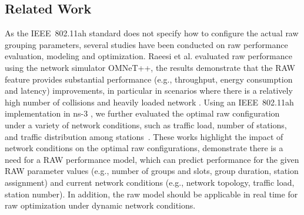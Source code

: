  
\subsection{Related Work \label{subsec:related_work}}


As the IEEE~802.11ah standard does not specify how to configure the actual \gls{raw} grouping parameters, several studies have been conducted on \gls{raw} performance evaluation, modeling and optimization. Raeesi et al. evaluated  \gls{raw} performance using the network simulator OMNeT++, the results demonstrate that the RAW feature provides
substantial performance (e.g., throughput, energy consumption and latency) improvements, in particular in scenarios where there is a relatively high number of collisions and heavily loaded network \cite{Raeesi2014a}. Using an IEEE~802.11ah implementation in ns-3
\cite{WNS32016}, we further evaluated the optimal \gls{raw}  configuration under a variety of network conditions, such as traffic load, number of stations, and traffic distribution among stations~\cite{WoWMoM2016}. These works highlight the impact of network conditions on the optimal \gls{raw} configurations, demonstrate there is a need for a \gls{RAW} performance model, which can predict performance for the given RAW parameter values (e.g., number of groups and slots, group duration, station assignment) and current network conditions (e.g., network topology, traffic load, station number). In addition, the \gls{raw} model should be applicable in real time for \gls{raw} optimization under dynamic network conditions.




